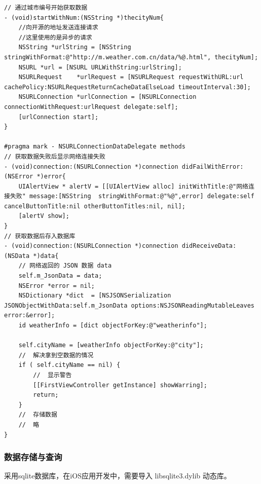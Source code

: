 \documentclass[UTF8,nofonts]{ctexart}
\begin{document}
\begin{lstlisting}[language={[ANSI]C++}]
// 通过城市编号开始获取数据
- (void)startWithNum:(NSString *)thecityNum{
    //向开源的地址发送连接请求
    //这里使用的是异步的请求
    NSString *urlString = [NSString stringWithFormat:@"http://m.weather.com.cn/data/%@.html", thecityNum];
    NSURL *url = [NSURL URLWithString:urlString];
    NSURLRequest    *urlRequest = [NSURLRequest requestWithURL:url cachePolicy:NSURLRequestReturnCacheDataElseLoad timeoutInterval:30];
    NSURLConnection *urlConnection = [NSURLConnection connectionWithRequest:urlRequest delegate:self];
    [urlConnection start];
}

#pragma mark - NSURLConnectionDataDelegate methods
// 获取数据失败后显示网络连接失败
- (void)connection:(NSURLConnection *)connection didFailWithError:(NSError *)error{
    UIAlertView * alertV = [[UIAlertView alloc] initWithTitle:@"网络连接失败" message:[NSString  stringWithFormat:@"%@",error] delegate:self cancelButtonTitle:nil otherButtonTitles:nil, nil];
    [alertV show];
}
// 获取数据后存入数据库
- (void)connection:(NSURLConnection *)connection didReceiveData:(NSData *)data{
    // 网络返回的 JSON 数据 data
    self.m_JsonData = data;
    NSError *error = nil;
    NSDictionary *dict  = [NSJSONSerialization JSONObjectWithData:self.m_JsonData options:NSJSONReadingMutableLeaves error:&error];
    id weatherInfo = [dict objectForKey:@"weatherinfo"];
    
    self.cityName = [weatherInfo objectForKey:@"city"];
	//  解决拿到空数据的情况
    if ( self.cityName == nil) {
        //	显示警告
        [[FirstViewController getInstance] showWarring];
        return;
    }
	//	存储数据
	//	略    
}
\end{lstlisting}

\subsubsection{数据存储与查询} %
采用sqlite数据库，在iOS应用开发中，需要导入 libsqlite3.dylib 动态库。
\end{document}
